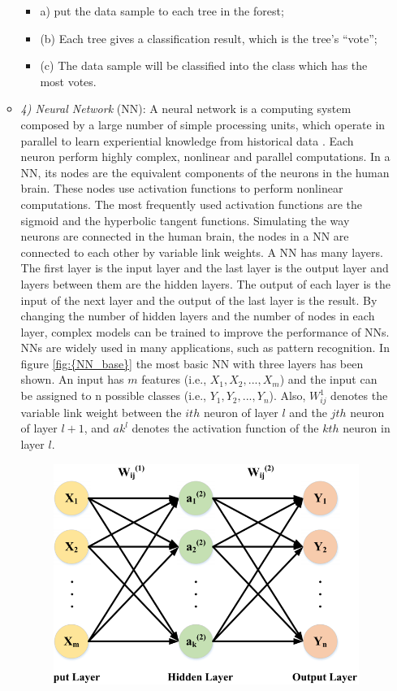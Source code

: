 \begin{itemize}
\begin{itemize}
\begin{itemize}
\item[]a) put the data sample to each tree in the forest;
\item[](b) Each tree gives a classification result, which is the tree’s “vote”;
\item[](c) The data sample will be classified into the class which has the most votes.
\end{itemize}
\item[]\textit{4) Neural Network} (NN): A neural network is a computing system composed by a large number of simple processing units, which operate in parallel to learn experiential knowledge from historical data \cite{Haykin}. Each neuron perform highly complex, nonlinear and parallel computations. In a NN, its nodes are the equivalent components of the neurons in the human brain. These nodes use activation functions to perform nonlinear computations. The most frequently used activation functions are the sigmoid and the hyperbolic tangent functions. Simulating the way neurons are connected in the human brain, the nodes in a NN are connected to each other by variable link weights.
A NN has many layers. The first layer is the input layer and the last layer is the output layer and layers between them are the hidden layers. The output of each layer is the input of the next layer and the output of the last layer is the result. By changing the number of hidden layers and the number of nodes in each layer, complex models can be trained to improve the performance of NNs. NNs are widely used in many applications, such as pattern recognition. In figure \ref{fig:{NN_base}} the most basic NN with three layers has been shown. An input has $m$ features (i.e., $X_{1},X_{2},...,X_{m}$) and the input can be assigned to n possible classes (i.e., $Y_{1},Y_{2},...,Y_{n}$). Also, $W_{ij}^{1}$ denotes the variable link weight between the $ith$ neuron of layer $l$ and the $jth$ neuron of layer $l + 1$, and $ak^{l}$ denotes the activation function of the $kth$ neuron in layer $l$.
\begin{figure}[tb!]
	\centering
	\includegraphics[width=13cm]{figure/NN_base.png}

\end{figure}
\end{itemize}
\end{itemize}
